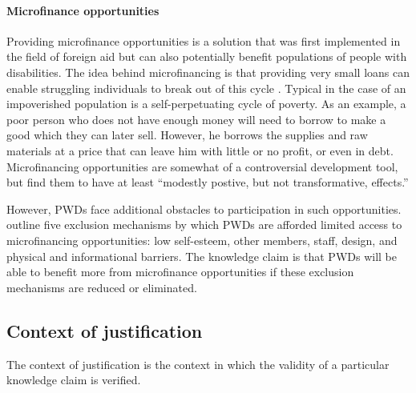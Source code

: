 \documentclass[a4paper]{article}
\begin{document}
\paragraph{Microfinance opportunities}


Providing microfinance opportunities is a solution that was first implemented
in the field of foreign aid but can also potentially benefit populations of
people with disabilities. The idea behind microfinancing is that providing
very small loans can enable struggling individuals to break out of this
cycle \citep{wendt2006building}. Typical in the case of an impoverished
population is a self-perpetuating cycle of poverty. As an example, a poor
person who does not have enough money will need to borrow to make a good which
they can later sell. However, he borrows the supplies and raw materials at a
price that can leave him with little or no profit, or even in debt.
Microfinancing opportunities are somewhat of a controversial development tool,
but \cite{banerjee2015six} find them to have at least ``modestly postive, but
not transformative, effects.''

However, PWDs face additional obstacles to participation in such
opportunities. \cite{mersland2008access} outline five exclusion mechanisms by
which PWDs are afforded limited access to microfinancing opportunities: low
self-esteem, other members, staff, design, and physical and informational
barriers. The knowledge claim is that PWDs will be able to benefit more from
microfinance opportunities if these exclusion mechanisms are reduced or
eliminated.

\subsection{Context of justification}

The context of justification is the context in which the validity of a
particular knowledge claim is verified.
\end{document}
